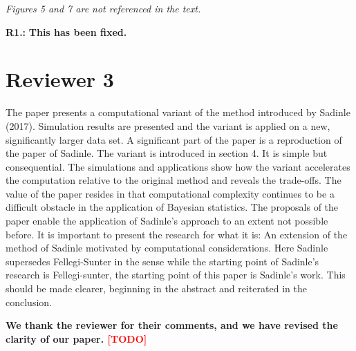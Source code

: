 \documentclass[letterpaper, parskip]{scrartcl}
\newcommand{\pointRaised}[1]{%
	\begin{tcolorbox}
		\itshape #1
	\end{tcolorbox}
}
\newcounter{responsectr}[section]     %
\newcommand{\reply}[2]{%
	\refstepcounter{responsectr}%
	\textbf{#1.\theresponsectr:} #2
}
\newcommand{\todo}{\textcolor{red}{[TODO]}\xspace}
\begin{document}
		\pointRaised{%
	Figures 5 and 7 are not referenced in the text.
}
		\reply{R1}{%
	\textbf{This has been fixed.}
	}



	\clearpage
	\newpage
	
	\section*{Reviewer 3}
	\setcounter{responsectr}{0}

	The paper presents a computational variant of the method introduced by Sadinle (2017). Simulation
	results are presented and the variant is applied on a new, significantly larger data set.
	A significant part of the paper is a reproduction of the paper of Sadinle. The variant is introduced in
	section 4. It is simple but consequential. The simulations and applications show how the variant
	accelerates the computation relative to the original method and reveals the trade-offs.
	The value of the paper resides in that computational complexity continues to be a difficult obstacle in
	the application of Bayesian statistics. The proposals of the paper enable the application of Sadinle’s
	approach to an extent not possible before.
	It is important to present the research for what it is: An extension of the method of Sadinle motivated
	by computational considerations. Here Sadinle supersedes Fellegi-Sunter in the sense while the starting
	point of Sadinle’s research is Fellegi-sunter, the starting point of this paper is Sadinle’s work. This should
	be made clearer, beginning in the abstract and reiterated in the conclusion.
	
	\textbf{We thank the reviewer for their comments, and we have revised the clarity of our paper. \todo}	
	
	
\end{document}
